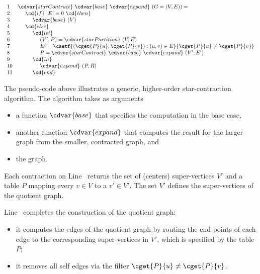 \begin{algorithm}
\label{alg:graphcon::sc}
\[
\begin{array}{ll}
1 & \cdvar{starContract}~\cdvar{base}~\cdvar{expand}~(G = (V,E)) =
\\ 
2 & ~~~~\cd{if}~|E| = 0~\cd{then}
\\
3 & ~~~~~~~~\cdvar{base}~(V)
\\
4 & ~~~~\cd{else}
\\ 
5 & ~~~~~~~~\cd{let}
\\ 
6 & ~~~~~~~~~~~~(V',P) = \cdvar{starPartition}~(V,E)~ %
\\
7 & ~~~~~~~~~~~~E' = \csetf{(\cget{P}{u},\cget{P}{v}) : (u,v) \in  E}{\cget{P}{u} \neq \cget{P}{v}} 
\\
8 & ~~~~~~~~~~~~R = \cdvar{starContract}~\cdvar{base}~\cdvar{expand}~(V',E')
\\
9 & ~~~~~~~~\cd{in}
\\
10 & ~~~~~~~~~~~~\cdvar{expand}~(P, R)
\\
11 & ~~~~~~~~\cd{end}
\end{array}
\]

The pseudo-code above illustrates a generic, higher-order
star-contraction algorithm.
%
The algorithm takes as arguments
\begin{itemize}
\item  a function $\cdvar{base}$ that specifies
the computation in the base case,

\item 
another function $\cdvar{expand}$ that computes the result for the larger
graph from the smaller, contracted graph, and 

\item
the graph.
\end{itemize}


Each contraction on Line~\linegcscpartition{} returns the set of
(centers) super-vertices $V'$ and a table $P$ mapping every $v \in V$
to a $v' \in V'$.
%
The set $V'$ defines the super-vertices of the quotient graph.
%

Line~\linegcscedges{} completes the construction of the quotient graph:
%
\begin{itemize}
\item it computes the edges of the quotient graph by 
routing the end points of each edge to the corresponding
super-vertices in $V'$, which is specified by the table $P$;
%
\item it  removes all self edges via the  filter $\cget{P}{u}
\neq \cget{P}{v}$.
%
\end{itemize}
%


\end{algorithm}
